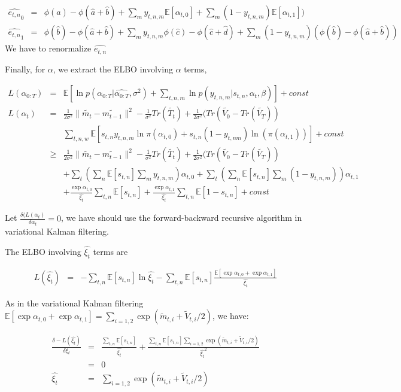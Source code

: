 \documentclass[11pt]{report}
\newcommand{\Ep}{\mathbb{E}}
\begin{document}
\begin{eqnarray}
\hat{e_{t,n}}_0 & = &\phi(\hat{a})-\phi(\hat{a}+\hat{b}) + \sum_{m}  y_{t,n,m}   \Ep[\alpha_{t,0}] +\sum_m (1-y_{t,n,m}) \Ep[\alpha_{t,1}])   \\\nonumber
\hat{e_{t,n}}_1 & = &\phi(\hat{b})-\phi(\hat{a}+\hat{b}) + \sum_{m}  y_{t,n,m} \phi(\hat{c})-\phi(\hat{c}+\hat{d}) +\sum_m (1-y_{t,n,m}) (\phi(\hat{b})-\phi(\hat{a}+\hat{b})) 
\end{eqnarray}
We have to renormalize $\hat{e_{t,n}}$

Finally, for $\alpha$, we extract the ELBO involving $\alpha$ terms, 

\begin{eqnarray*}
L(\alpha_{0:T}) & = & \Ep[\ln p(\alpha_{0:T}|\hat{\alpha_{0:T}},\sigma^2) + \sum_{t,n,m}  \ln p(y_{t,n,m}|s_{t,n},\alpha_t,\beta) ] + const \\\nonumber
L(\alpha_t) & = & \frac{1}{2\sigma^2} \|\tilde{m_t}-\tilde{m_{t-1}}\|^2 - \frac{1}{\sigma^2} Tr(\tilde {T_t}) + \frac{1}{2\sigma^2} (Tr(\tilde{V_0} - Tr(\tilde{V_T})) \\\nonumber
& & \sum_{t,n,w} \Ep [s_{t,n} y_{t,n,m} \ln \pi(\alpha_{t,0}) + s_{t,n}(1-y_{t,nm}) \ln (\pi(\alpha_{t,1}))] + const \\\nonumber
& \geq & \frac{1}{2\sigma^2} \|\tilde{m_t}-\tilde{m_{t-1}}\|^2 - \frac{1}{\sigma^2} Tr(\tilde {T_t}) + \frac{1}{2\sigma^2} (Tr(\tilde{V_0} - Tr(\tilde{V_T})) \\\nonumber
& & + \sum_t(\sum_n \Ep[s_{t,n}] \sum_m y_{t,n,m}) \alpha_{t,0} + \sum_t(\sum_n \Ep[s_{t,n}] \sum_m (1-y_{t,n,m})) \alpha_{t,1}\\\nonumber
& & + \frac{\exp \alpha_{t,0}}{\hat{\xi_t}}\sum_{t,n} \Ep[s_{t,n}]  + \frac{\exp \alpha_{t,1}}{\hat{\xi_t}}\sum_{t,n} \Ep[1-s_{t,n}]  + const
\end{eqnarray*}

Let $\frac{\delta(L(\alpha_t)}{\delta \alpha_t}=0$, we have should use the forward-backward recursive algorithm in variational Kalman filtering. 

The ELBO involving $\hat{\xi_t}$ terms are 

\begin{eqnarray*}
L(\hat{\xi_t}) & = & - \sum_{t,n} \Ep[s_{t,n}] \ln \hat{\xi_t}  -  \sum_{t,n} \Ep[s_{t,n}] \frac{\Ep[\exp \alpha_{t,0} + \exp \alpha_{t,1} ]}{\hat{\xi_t}} 
\end{eqnarray*}

As in the variational Kalman filtering $\Ep[\exp \alpha_{t,0} + \exp \alpha_{t,1}]=\sum_{i=1,2} \exp (\tilde{m}_{t,i}+\tilde{V}_{t,i}/2)$, we have:

\begin{eqnarray}
\frac{\delta -L(\hat{\xi_t}) }{\delta \xi_t} & = & \frac{\sum_{t,n} \Ep[s_{t,n}] }{ \hat{\xi_t}  } + \frac{ \sum_{t,n} \Ep[s_{t,n}]  \sum_{i=1,2} \exp (\tilde{m}_{t,i}+\tilde{V}_{t,i}/2)}{\hat{\xi_t} ^2}\\\nonumber
& = & 0\\\nonumber
\hat{\xi_t} & = &  \sum_{i=1,2} \exp (\tilde{m}_{t,i}+\tilde{V}_{t,i}/2)
 \end{eqnarray}
\end{document}
